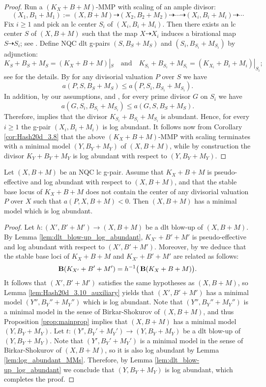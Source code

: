 	\begin{proof}
		Run a $(K_X+B+M)$-MMP with scaling of an ample divisor:
		$$ (X_1, B_1+M_1) := (X,B+M) \dashrightarrow (X_2,B_2+M_2) \dashrightarrow \cdots \dashrightarrow (X_i,B_i+M_i)\dashrightarrow \cdots $$
		Fix $i\geq 1$ and pick an lc center $S_i$ of $(X_i,B_i+M_i)$. Then there exists an lc center $S$ of $(X,B+M)$ such that the map $X \dashrightarrow X_i$ induces a birational map $S \dashrightarrow S_i$; see \cite[Lemma 2.18(iii)]{Tsak21}. Define NQC dlt g-pairs $(S,B_S+M_S)$ and $(S_i,B_{S_i}+M_{S_i})$ by adjunction: 
		\[ K_S+B_S+M_S=(K_X+B+M)|_S \quad \text{and} \quad K_{S_i}+B_{S_i}+M_{S_i}=(K_{X_i}+B_i+M_i)|_{S_i} ; \]
		see \cite[Subsection 2.3]{HanLi22} for the details. By \cite[Lemma 2.18(iv)]{Tsak21} for any divisorial valuation $P$ over $S$ we have
		\[ a(P,S,B_S+M_S) \leq a(P,S_i,B_{S_i}+M_{S_i}) . \]
		In addition, by our assumptions, \cite[Lemma 3.5]{Hash22a} and \cite[Lemma 3.6(4)]{LX22a}, for every prime divisor $G$ on $S_i$ we have 
		\[ a(G,S_i,B_{S_i}+M_{S_i})\leq a(G,S,B_S+M_S) . \]
		Therefore, \cite[Lemma 3.9]{Hash22a} implies that the divisor $K_{S_i}+B_{S_i}+M_{S_i}$ is abundant. Hence, for every $i \geq 1$ the g-pair $(X_i,B_i+M_i)$ is log abundant. It follows now from Corollary \ref{cor:Hash20d_3.8} that the above $(K_X+B+M)$-MMP with scaling terminates with a minimal model $(Y,B_Y+M_Y)$ of $(X,B+M)$, while by construction the divisor $K_Y+B_Y+M_Y$ is log abundant with respect to $(Y,B_Y+M_Y)$.
	\end{proof}
	
	\begin{cor}\label{cor:Hash20d_3.10}
		Let $(X,B+M)$ be an NQC lc g-pair. Assume that $K_X+B+M$ is pseudo-effective and log abundant with respect to $(X,B+M)$, and that the stable base locus of $K_X+B+M$ does not contain the center of any divisorial valuation $P$ over $X$ such that $ a(P,X,B+M) < 0 $. Then $(X,B+M)$ has a minimal model which is log abundant.
	\end{cor}
	
	\begin{proof}
		Let $ h \colon (X',B'+M') \to (X,B+M) $ be a dlt blow-up of $(X,B+M)$. By Lemma \ref{lem:dlt_blow-up_log_abundant}, $K_{X'}+B'+M'$ is pseudo-effective and log abundant with respect to $(X',B'+M')$. Moreover, by \cite[Lemma 2.3]{LMT} we deduce that the stable base loci of $K_X+B+M$ and $K_{X'}+B'+M'$ are related as follows:
		\[ \operatorname{\mathbf{B}}(K_{X'}+B'+M') = h^{-1} \big( \operatorname{\mathbf{B}}(K_X+B+M) \big) . \]
		It follows that $(X',B'+M')$ satisfies the same hypotheses as $(X,B+M)$, so Lemma \ref{lem:Hash20d_3.10_auxiliary} yields that $(X',B'+M')$ has a minimal model $(Y'',B_Y''+M_Y'')$ which is log abundant. Note that $(Y'',B_Y''+M_Y'')$ is a minimal model in the sense of Birkar-Shokurov of $(X,B+M)$, and thus Proposition \ref{prop:mainprop} implies that $(X,B+M)$ has a minimal model $(Y,B_Y+M_Y)$. Let $ t \colon (Y',B_Y'+M_Y') \to (Y,B_Y+M_Y) $ be a dlt blow-up of $(Y,B_Y+M_Y)$. Note that $(Y',B_Y'+M_Y')$ is a minimal model in the sense of Birkar-Shokurov of $(X,B+M)$, so it is also log abundant by Lemma \ref{lem:log_abundant_MMs}. Therefore, by Lemma \ref{lem:dlt_blow-up_log_abundant} we conclude that $(Y,B_Y+M_Y)$ is log abundant, which completes the proof.
	\end{proof}
	
